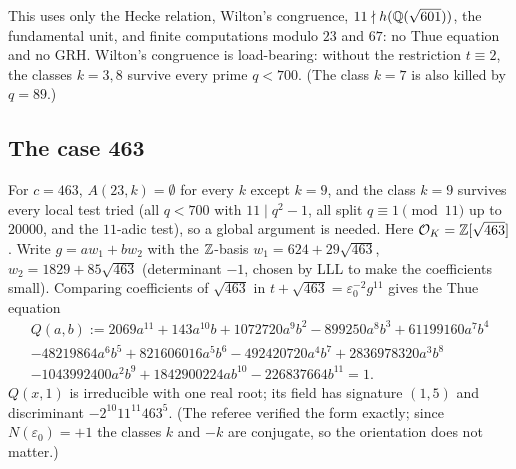 This uses only the Hecke relation, Wilton's congruence, $11\nmid h(\mathbb Q(\sqrt{601}))$, the fundamental unit, and finite computations modulo $23$ and $67$: no Thue equation and no GRH. Wilton's congruence is load-bearing: without the restriction $t\equiv2$, the classes $k=3,8$ survive every prime $q<700$. (The class $k=7$ is also killed by $q=89$.)

\subsection{The case 463}\label{sec:463}
For $c=463$, $A(23,k)=\emptyset$ for every $k$ except $k=9$, and the class $k=9$ survives every local test tried (all $q<700$ with $11\mid q^2-1$, all split $q\equiv1\pmod{11}$ up to $20000$, and the $11$-adic test), so a global argument is needed. Here $\mathcal O_K=\mathbb Z[\sqrt{463}]$. Write $g=aw_1+bw_2$ with the $\mathbb Z$-basis $w_1=624+29\sqrt{463}$, $w_2=1829+85\sqrt{463}$ (determinant $-1$, chosen by LLL to make the coefficients small). Comparing coefficients of $\sqrt{463}$ in $t+\sqrt{463}=\varepsilon_0^{-2}g^{11}$ gives the Thue equation
\begin{multline*}
Q(a,b):=2069a^{11}+143a^{10}b+1072720a^9b^2-899250a^8b^3+61199160a^7b^4\\-48219864a^6b^5+821606016a^5b^6-492420720a^4b^7+2836978320a^3b^8\\-1043992400a^2b^9+1842900224ab^{10}-226837664b^{11}=1 .
\end{multline*}
$Q(x,1)$ is irreducible with one real root; its field has signature $(1,5)$ and discriminant $-2^{10}11^{11}463^5$. (The referee verified the form exactly; since $N(\varepsilon_0)=+1$ the classes $k$ and $-k$ are conjugate, so the orientation does not matter.)

